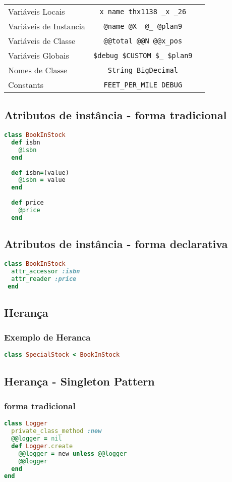 \documentclass[serif,mathserif]{article}
\begin{document}
\begin{tabular}{ l | c | r }
Variáveis Locais & \verb|x name thx1138 _x _26| \\
Variáveis de Instancia & \verb|@name @X  @_ @plan9| \\
Variáveis de Classe & \verb|@@total @@N @@x_pos| \\
Variáveis Globais & \verb|$debug $CUSTOM $_ $plan9| \\
Nomes de Classe & \verb|String BigDecimal| \\
Constants & \verb|FEET_PER_MILE DEBUG|
\end{tabular}

\subsection{Atributos de instância - forma tradicional}
\begin{lstlisting}[language=ruby]
class BookInStock  
  def isbn
    @isbn
  end
 
  def isbn=(value)
    @isbn = value
  end
 
  def price
    @price
  end
\end{lstlisting}

\subsection{Atributos de instância - forma declarativa}
\begin{lstlisting}[language=ruby]
class BookInStock  
  attr_accessor :isbn
  attr_reader :price
 end
\end{lstlisting}

\subsection{Herança}
\subsubsection{Exemplo de Heranca}
\begin{lstlisting}[language=ruby]
class SpecialStock < BookInStock
\end{lstlisting}

\subsection{Herança - Singleton Pattern}

\subsubsection{forma tradicional}
\begin{lstlisting}[language=ruby]
class Logger
  private_class_method :new
  @@logger = nil
  def Logger.create
    @@logger = new unless @@logger
    @@logger
  end
end
\end{lstlisting}
\end{document}
